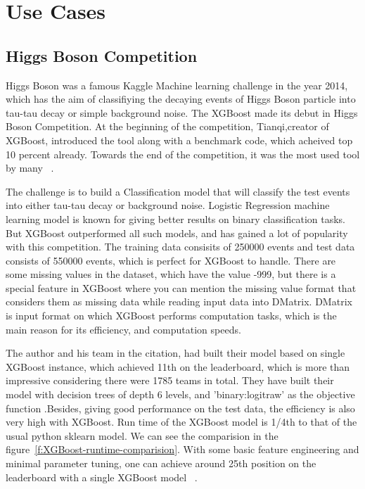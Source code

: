\section{Use Cases}

\subsection{Higgs Boson Competition}

Higgs Boson was a famous Kaggle Machine learning challenge in the year 2014,
which has the  aim of classifiying the decaying events of Higgs Boson particle
into tau-tau decay or simple  background noise. The XGBoost made its debut in
Higgs Boson Competition. At the beginning of  the competition, Tianqi,creator
of XGBoost, introduced the tool along with a benchmark code,  which acheived
top 10 percent already. Towards the end of the competition, it was the most
used tool by many ~\cite{hid-sp18-401-Kaggle-Higgs-Boson}. 

The challenge is to build a Classification model that will classify the test
events into either tau-tau decay or background noise. Logistic Regression
machine learning model is known for giving better results on binary
classification tasks. But XGBoost outperformed all such models, and has gained
a lot of popularity with this competition. The training data consisits of
250000 events and test data consists of 550000 events, which is perfect for
XGBoost to handle. There are some missing values in the dataset, which  have
the value -999, but there is a special feature in XGBoost where you can
mention the missing value format that considers them as missing data while
reading input data into DMatrix. DMatrix is input format on which XGBoost
performs computation tasks, which is the main reason for its efficiency, and
computation speeds.

The author and his team in the citation, had built their model based on single
XGBoost instance, which achieved 11th on the leaderboard, which is more than
impressive considering there were 1785 teams in total. They have built their
model with decision trees of depth 6 levels, and 'binary:logitraw' as the
objective function .Besides, giving good performance on the test data, the
efficiency is also very high with XGBoost. Run time of the XGBoost model is
1/4th to that of the usual python sklearn model. We can see the comparision in
the figure~\ref{f:XGBoost-runtime-comparision}. With some basic feature
engineering and minimal parameter tuning, one can achieve around 25th position
on the leaderboard with a single XGBoost model ~\cite{hid-sp18-401 -XGBoost-
pdf}.

